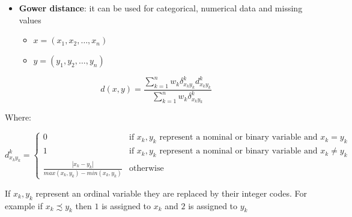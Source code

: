 \documentclass[
  ignorenonframetext,
]{beamer}
\providecommand{\tightlist}{%
  \setlength{\itemsep}{0pt}\setlength{\parskip}{0pt}}\usepackage{longtable,booktabs,array}
\begin{document}
\begin{frame}{}
\label{section-14}
\begin{itemize}
\item
  \textbf{Gower distance}: it can be used for categorical, numerical
  data and missing values

  \begin{itemize}
  \tightlist
  \item
    \(x = (x_1, x_2, \ldots, x_n)\)
  \item
    \(y = (y_1, y_2, \ldots, y_n)\)
  \end{itemize}
\end{itemize}

\[d(x,y) = \frac{\sum_{k=1}^n w_k \delta_{x_ky_k}^kd_{x_ky_k}^k}{\sum_{k=1}^n w_k\delta_{x_ky_k}^k}\]

\scriptsize

Where:

\tiny

\[d_{x_ky_k}^k = 
  \begin{cases}
   0 & \text{if } x_k, y_k \text{ represent a nominal or binary variable and } x_k = y_k \\
   1 & \text{if } x_k, y_k \text{ represent a nominal or binary variable and } x_k \neq y_k \\
   \frac{\left| x_k - y_k \right|}{max(x_k, y_k) - min(x_k, y_k)} & \text{otherwise}
  \end{cases}\]

\scriptsize

If \(x_k, y_k\) represent an ordinal variable they are replaced by their
integer codes. For example if \(x_k \precsim y_k\) then \(1\) is
assigned to \(x_k\) and \(2\) is assigned to \(y_k\)
\end{frame}
\end{document}
